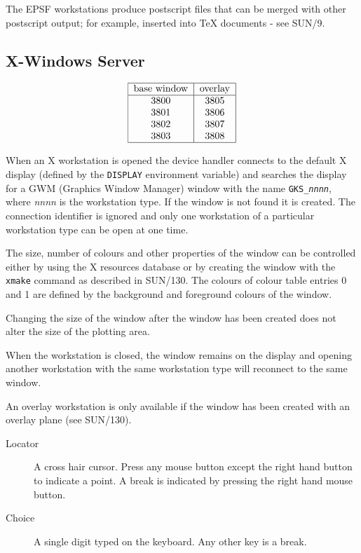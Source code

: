 \documentclass[11pt]{article}
\newcommand{\xref}[3]{#1}
\begin{document}
The EPSF workstations produce postscript files that can be merged with other
postscript output; for example, inserted into TeX documents - see 
\xref{SUN/9}{sun9}{}.

\subsection{X-Windows Server}
\label{xwin}


\[\begin{tabular}{|c|c|}\hline
base window &overlay\\\hline
3800 &3805 \\
3801 &3806 \\
3802 &3807 \\
3803 &3808 \\\hline
\end{tabular}\]


When an X workstation is opened the device handler connects to the
default X display (defined by the {\tt DISPLAY} environment variable) 
and searches the display for a GWM 
(\xref{Graphics Window Manager}{sun130}{}) window 
with the name {\tt GKS\_{\em{nnnn}}}, 
where {\em nnnn} is the workstation type. If the window is
not found it is created. The connection
identifier is ignored and only one workstation of a particular
workstation type can be open at one time.

The size, number of colours and other properties of the window can be
controlled either by using the X resources database or by creating the
window with the {\tt xmake} command as described in SUN/130. The colours
of colour table entries 0 and 1 are defined by the background and
foreground colours of the window.

Changing the size of the window after the window has been created does
not alter the size of the plotting area.

When the workstation is closed, the window remains on the display and
opening another workstation with the same workstation type will
reconnect to the same window.

An overlay workstation is only available if the window has been created
with an overlay plane (see \xref{SUN/130}{sun130}{xmakeCommand}).


\begin{description}
\item[Locator] A cross hair cursor.
Press any mouse button except the right hand button to indicate a point. A 
break is indicated by pressing the right hand mouse button.
\item[Choice] A single digit typed on the keyboard.
Any other key is a break.
\end{description}
\end{document}
